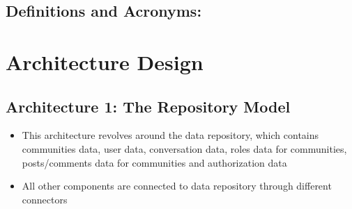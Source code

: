 \documentclass[11pt]{article}
\begin{document}
\subsection{Definitions and Acronyms:}


\section{ Architecture Design}

\subsection{Architecture 1: The Repository Model}

\begin{itemize}
    \item This architecture revolves around the data repository, which contains communities data, user data, conversation data, roles data for communities, posts/comments data for communities and authorization data
    \item All other components are connected to data repository through different connectors
\end{itemize}
\end{document}
